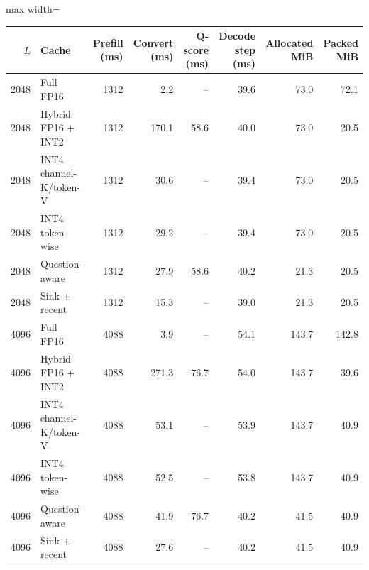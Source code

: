 \scriptsize
\setlength{\tabcolsep}{3.5pt}
\label{tab:t2csys}
\begin{adjustbox}{max width=\linewidth}
\begin{tabular}{rlrrrrrr}
\toprule
$L$ & Cache & Prefill (ms) & Convert (ms) & Q-score (ms) & Decode step (ms) & Allocated MiB & Packed MiB \\
\midrule
2048 & Full FP16 & 1312 & 2.2 & -- & 39.6 & 73.0 & 72.1 \\
2048 & Hybrid FP16 + INT2 & 1312 & 170.1 & 58.6 & 40.0 & 73.0 & 20.5 \\
2048 & INT4 channel-K/token-V & 1312 & 30.6 & -- & 39.4 & 73.0 & 20.5 \\
2048 & INT4 token-wise & 1312 & 29.2 & -- & 39.4 & 73.0 & 20.5 \\
2048 & Question-aware & 1312 & 27.9 & 58.6 & 40.2 & 21.3 & 20.5 \\
2048 & Sink + recent & 1312 & 15.3 & -- & 39.0 & 21.3 & 20.5 \\
4096 & Full FP16 & 4088 & 3.9 & -- & 54.1 & 143.7 & 142.8 \\
4096 & Hybrid FP16 + INT2 & 4088 & 271.3 & 76.7 & 54.0 & 143.7 & 39.6 \\
4096 & INT4 channel-K/token-V & 4088 & 53.1 & -- & 53.9 & 143.7 & 40.9 \\
4096 & INT4 token-wise & 4088 & 52.5 & -- & 53.8 & 143.7 & 40.9 \\
4096 & Question-aware & 4088 & 41.9 & 76.7 & 40.2 & 41.5 & 40.9 \\
4096 & Sink + recent & 4088 & 27.6 & -- & 40.2 & 41.5 & 40.9 \\
\bottomrule
\end{tabular}
\end{adjustbox}

